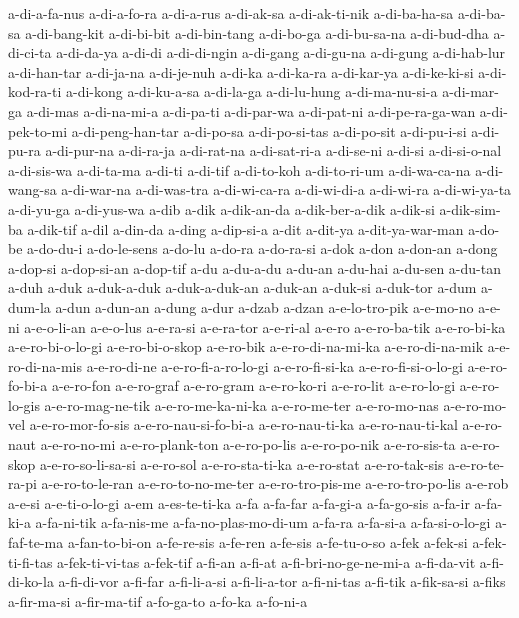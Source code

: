 {a-di-a-fa-nus a-di-a-fo-ra a-di-a-rus a-di-ak-sa a-di-ak-ti-nik
a-di-ba-ha-sa a-di-ba-sa a-di-bang-kit a-di-bi-bit a-di-bin-tang
a-di-bo-ga a-di-bu-sa-na a-di-bud-dha a-di-ci-ta a-di-da-ya a-di-di
a-di-di-ngin a-di-gang a-di-gu-na a-di-gung a-di-hab-lur a-di-han-tar
a-di-ja-na a-di-je-nuh a-di-ka a-di-ka-ra a-di-kar-ya a-di-ke-ki-si
a-di-kod-ra-ti a-di-kong a-di-ku-a-sa a-di-la-ga a-di-lu-hung
a-di-ma-nu-si-a a-di-mar-ga a-di-mas a-di-na-mi-a a-di-pa-ti a-di-par-wa
a-di-pat-ni a-di-pe-ra-ga-wan a-di-pek-to-mi a-di-peng-han-tar a-di-po-sa
a-di-po-si-tas a-di-po-sit a-di-pu-i-si a-di-pu-ra a-di-pur-na a-di-ra-ja
a-di-rat-na a-di-sat-ri-a a-di-se-ni a-di-si a-di-si-o-nal a-di-sis-wa
a-di-ta-ma a-di-ti a-di-tif a-di-to-koh a-di-to-ri-um a-di-wa-ca-na
a-di-wang-sa a-di-war-na a-di-was-tra a-di-wi-ca-ra a-di-wi-di-a
a-di-wi-ra a-di-wi-ya-ta a-di-yu-ga a-di-yus-wa a-dib a-dik a-dik-an-da
a-dik-ber-a-dik a-dik-si a-dik-sim-ba a-dik-tif a-dil a-din-da a-ding
a-dip-si-a a-dit a-dit-ya a-dit-ya-war-man a-do-be a-do-du-i a-do-le-sens
a-do-lu a-do-ra a-do-ra-si a-dok a-don a-don-an a-dong a-dop-si
a-dop-si-an a-dop-tif a-du a-du-a-du a-du-an a-du-hai a-du-sen a-du-tan
a-duh a-duk a-duk-a-duk a-duk-a-duk-an a-duk-an a-duk-si a-duk-tor a-dum
a-dum-la a-dun a-dun-an a-dung a-dur a-dzab a-dzan a-e-lo-tro-pik
a-e-mo-no a-e-ni a-e-o-li-an a-e-o-lus a-e-ra-si a-e-ra-tor a-e-ri-al
a-e-ro a-e-ro-ba-tik a-e-ro-bi-ka a-e-ro-bi-o-lo-gi a-e-ro-bi-o-skop
a-e-ro-bik a-e-ro-di-na-mi-ka a-e-ro-di-na-mik a-e-ro-di-na-mis
a-e-ro-di-ne a-e-ro-fi-a-ro-lo-gi a-e-ro-fi-si-ka a-e-ro-fi-si-o-lo-gi
a-e-ro-fo-bi-a a-e-ro-fon a-e-ro-graf a-e-ro-gram a-e-ro-ko-ri a-e-ro-lit
a-e-ro-lo-gi a-e-ro-lo-gis a-e-ro-mag-ne-tik a-e-ro-me-ka-ni-ka
a-e-ro-me-ter a-e-ro-mo-nas a-e-ro-mo-vel a-e-ro-mor-fo-sis
a-e-ro-nau-si-fo-bi-a a-e-ro-nau-ti-ka a-e-ro-nau-ti-kal a-e-ro-naut
a-e-ro-no-mi a-e-ro-plank-ton a-e-ro-po-lis a-e-ro-po-nik a-e-ro-sis-ta
a-e-ro-skop a-e-ro-so-li-sa-si a-e-ro-sol a-e-ro-sta-ti-ka a-e-ro-stat
a-e-ro-tak-sis a-e-ro-te-ra-pi a-e-ro-to-le-ran a-e-ro-to-no-me-ter
a-e-ro-tro-pis-me a-e-ro-tro-po-lis a-e-rob a-e-si a-e-ti-o-lo-gi a-em
a-es-te-ti-ka a-fa a-fa-far a-fa-gi-a a-fa-go-sis a-fa-ir a-fa-ki-a
a-fa-ni-tik a-fa-nis-me a-fa-no-plas-mo-di-um a-fa-ra a-fa-si-a
a-fa-si-o-lo-gi a-faf-te-ma a-fan-to-bi-on a-fe-re-sis a-fe-ren a-fe-sis
a-fe-tu-o-so a-fek a-fek-si a-fek-ti-fi-tas a-fek-ti-vi-tas a-fek-tif
a-fi-an a-fi-at a-fi-bri-no-ge-ne-mi-a a-fi-da-vit a-fi-di-ko-la
a-fi-di-vor a-fi-far a-fi-li-a-si a-fi-li-a-tor a-fi-ni-tas a-fi-tik
a-fik-sa-si a-fiks a-fir-ma-si a-fir-ma-tif a-fo-ga-to a-fo-ka a-fo-ni-a
}
